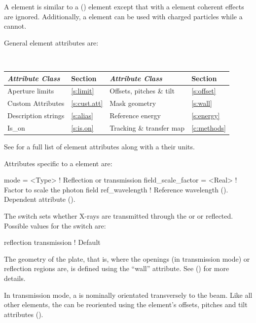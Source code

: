 A  element is similar to a 
() element except that with a  element coherent
effects are ignored. Additionally, a  element can be used
with charged particles while a  cannot.

General  element attributes are:
\begin{center}
\tt 
\begin{tabular}{llll} \toprule
  {\sl Attribute Class}      & Section          & {\sl Attribute Class}      & Section         \\ \midrule
  Aperture limits            & \ref{s:limit}    & Offsets, pitches \& tilt   & \ref{s:offset}   \\ 
  Custom Attributes          & \ref{s:cust.att} & Mask geometry              & \ref{s:wall}    \\
  Description strings        & \ref{s:alias}    & Reference energy           & \ref{s:energy}  \\
  Is_on                      & \ref{s:is.on}    & Tracking \& transfer map   & \ref{c:methods} \\
  \bottomrule
\end{tabular}
\end{center}
\toffset
See  for a full list of element attributes along with a their units.

Attributes specific to a  element are:
\begin{example}
  mode               = <Type>   ! Reflection or transmission
  field_scale_factor = <Real>   ! Factor to scale the photon field
  ref_wavelength                ! Reference wavelength (). Dependent attribute ().
\end{example}

The  switch sets whether X-rays are transmitted through the
 or or reflected. Possible values for the
 switch are:
\begin{example}
  reflection
  transmission        ! Default
\end{example}

The geometry of the plate, that is, where the openings (in
transmission mode) or reflection regions are, is defined using the
``wall'' attribute. See () for more details.

In transmission mode, a  is nominally orientated
transversely to the beam. Like all other elements, the
 can be reoriented using the element's offsets,
pitches and tilt attributes ().

